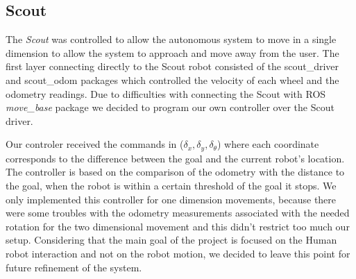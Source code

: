 \subsection{Scout}
The \textit{Scout} was controlled to allow the autonomous system to move in a single dimension to allow the system to approach and move away from the user.
The first layer connecting directly to the Scout robot consisted of the scout\_driver and scout\_odom packages which controlled the velocity of each wheel and the odometry readings.  
Due to difficulties with connecting the Scout with ROS \textit{move\_base} package we decided to program our own controller over the Scout driver. 

Our controler received the commands in ($\delta_x, \delta_y, \delta_\theta$) where each coordinate corresponds to the difference between the goal and the current robot's location. The controller is based on the comparison of the odometry with the distance to the goal, when the robot is within a certain threshold of the goal it stops. We only implemented this controller for one dimension movements, because there were some troubles with the odometry measurements associated with the needed rotation for the two dimensional movement and this didn't restrict too much our setup. Considering that the main goal of the project is focused on the Human robot interaction and not on the robot motion, we decided to leave this point for future refinement of the system.





